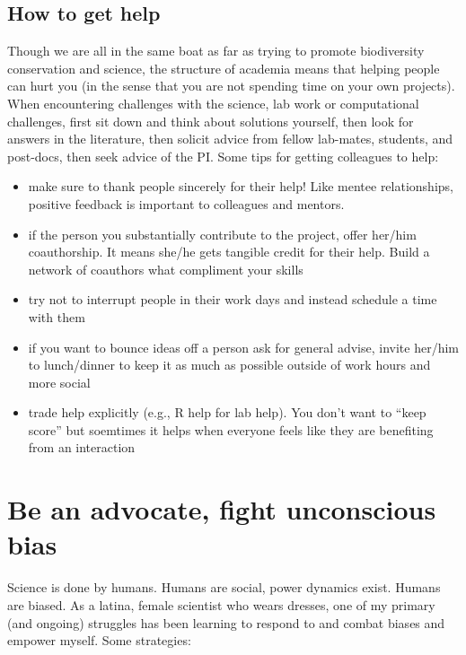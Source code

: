 \documentclass[12pt]{article}
\begin{document}
\subsection{How to get help}
\label{sec:help}
Though we are all in the same boat as far as trying to promote
biodiversity conservation and science, the structure of academia means
that helping people can hurt you (in the sense that you are not
spending time on your own projects). When encountering challenges with
the science, lab work or computational challenges, first sit down and
think about solutions yourself, then look for answers in the
literature, then solicit advice from fellow lab-mates, students, and
post-docs, then seek advice of the PI. Some tips for getting
colleagues to help:
\begin{itemize}
\item make sure to thank people sincerely for their help! Like mentee
  relationships, positive feedback is important to colleagues and
  mentors. 
\item if the person you substantially contribute to the project, offer
  her/him coauthorship. It means she/he gets tangible credit for their
  help. Build a network of coauthors what compliment your skills
\item try not to interrupt people in their work days and instead
  schedule a time with them
\item if you want to bounce ideas off a person ask for general advise,
  invite her/him to lunch/dinner to keep it as much as possible
  outside of work hours and more social
\item trade help explicitly (e.g., R help for lab help). You don't
  want to ``keep score'' but soemtimes it helps when everyone feels
  like they are benefiting from an interaction
\end{itemize}


\section{Be an advocate, fight unconscious bias}
\label{sec:advocate}
Science is done by humans. Humans are social, power dynamics
exist. Humans are biased. As a latina, female scientist who wears
dresses, one of my primary (and ongoing) struggles has been learning
to respond to and combat biases and empower myself. Some strategies:
 
\end{document}
